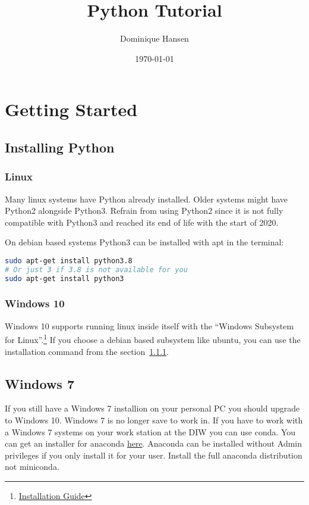 \documentclass{article}
\title{Python Tutorial}
\author{Dominique Hansen}
\date{\today}
\begin{document}
\maketitle

\section{Getting Started}

\subsection{Installing Python}

\subsubsection{Linux}\label{linux_python_install}
Many linux systems have Python already installed.
Older systems might have Python2 alongside Python3.
Refrain from using Python2 since it is not fully compatible with Python3
and reached its end of life with the start of 2020.

On debian based systems Python3 can be installed with apt in the terminal:

\begin{lstlisting}[language=Bash]
sudo apt-get install python3.8
# Or just 3 if 3.8 is not available for you
sudo apt-get install python3
\end{lstlisting}

\subsubsection{Windows 10}
Windows 10 supports running linux inside itself with the
``Windows Subsystem for Linux''.\footnote{\href{https://docs.microsoft.com/en-us/windows/wsl/install-win10}{Installation Guide}}
If you choose a debian based subsystem like ubuntu, you can use the
installation command from the section{~}\ref{linux_python_install}.

\subsection{Windows 7}
If you still have a Windows 7 installion on your personal PC you should upgrade to Windows 10.
Windows 7 is no longer save to work in.
If you have to work with a Windows 7 systems on your work station at the DIW you can use conda.
You can get an installer for anaconda \href{https://www.anaconda.com/distribution/#download-section}{here}.
Anaconda can be installed without Admin privileges if you only install it for your user.
Install the full anaconda distribution not miniconda.
\end{document}
